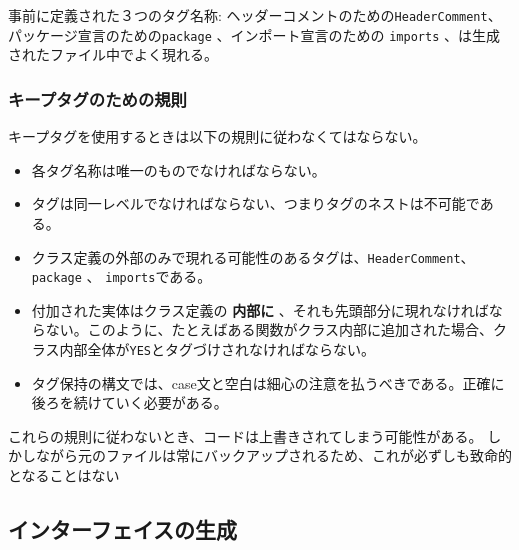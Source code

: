 \documentclass[\pformat,11pt]{jarticle}
\begin{document}
事前に定義された３つのタグ名称: ヘッダーコメントのための\texttt{HeaderComment}、パッケージ宣言のための\texttt{package} 、インポート宣言のための \texttt{imports} 、は生成されたファイル中でよく現れる。

\subsubsection{キープタグのための規則}

キープタグを使用するときは以下の規則に従わなくてはならない。
\begin{itemize}
\item 各タグ名称は唯一のものでなければならない。
\item タグは同一レベルでなければならない、つまりタグのネストは不可能である。
\item クラス定義の外部のみで現れる可能性のあるタグは、\texttt{HeaderComment}、 \texttt{package} 、 \texttt{imports}である。
\item 付加された実体はクラス定義の \textbf{内部に} 、それも先頭部分に現れなければならない。このように、たとえばある関数がクラス内部に追加された場合、クラス内部全体が\texttt{YES}とタグづけされなければならない。
\item タグ保持の構文では、case文と空白は細心の注意を払うべきである。正確に後ろを続けていく必要がある。
\end{itemize}
これらの規則に従わないとき、コードは上書きされてしまう可能性がある。
しかしながら元のファイルは常にバックアップされるため、これが必ずしも致命的となることはない


\subsection{インターフェイスの生成}\label{sec:interfaces}
\end{document}
